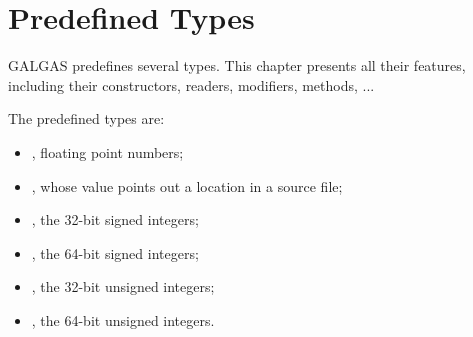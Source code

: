 \chapter{Predefined Types} \label{predefinedTypes}

GALGAS predefines several types. This chapter presents all their features, including their constructors, readers, modifiers, methods, ...


\begin{description}
\item The predefined types are:
\begin{itemize}
\item {}, floating point numbers;
\item {}, whose value points out a location in a source file;
\item {}, the 32-bit signed integers;
\item {}, the 64-bit signed integers;
\item {}, the 32-bit unsigned integers;
\item {}, the 64-bit unsigned integers.
\end{itemize}
\end{description}








